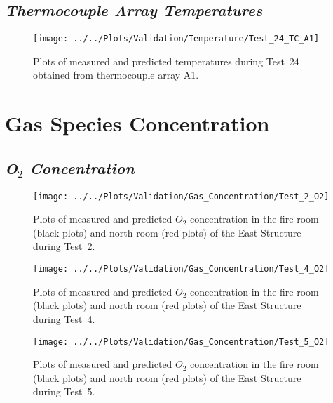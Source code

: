 \clearpage
\subsection*{\textit{Thermocouple Array Temperatures}}
\begin{figure}[!h]
	\centering
	\texttt{[image: ../../Plots/Validation/Temperature/Test\_24\_TC\_A1]}
	\caption[Plots of measured and predicted thermocouple array temperatures during Test~24.]{Plots of measured and predicted temperatures during Test~24 obtained from thermocouple array A1.}
	\label{fig:TCarray_data}
\end{figure}

\clearpage
\section{Gas Species Concentration}
\subsection*{\textit{O$_2$ Concentration}}
\begin{figure}[!h]
	\centering
	\texttt{[image: ../../Plots/Validation/Gas\_Concentration/Test\_2\_O2]}
	\caption[Plots of measured and predicted $O_2$ concentration during Test~2.]{Plots of measured and predicted $O_2$ concentration in the fire room (black plots) and north room (red plots) of the East Structure during Test~2.}
	\label{fig:Test2_O2}
\end{figure}

\begin{figure}[!h]
	\centering
	\texttt{[image: ../../Plots/Validation/Gas\_Concentration/Test\_4\_O2]}
	\caption[Plots of measured and predicted $O_2$ concentration during Test~4.]{Plots of measured and predicted $O_2$ concentration in the fire room (black plots) and north room (red plots) of the East Structure during Test~4.}
	\label{fig:Test4_O2}
\end{figure}

\begin{figure}[!h]
	\centering
	\texttt{[image: ../../Plots/Validation/Gas\_Concentration/Test\_5\_O2]}
	\caption[Plots of measured and predicted $O_2$ concentration during Test~5.]{Plots of measured and predicted $O_2$ concentration in the fire room (black plots) and north room (red plots) of the East Structure during Test~5.}
	\label{fig:Test5_O2}
\end{figure}

